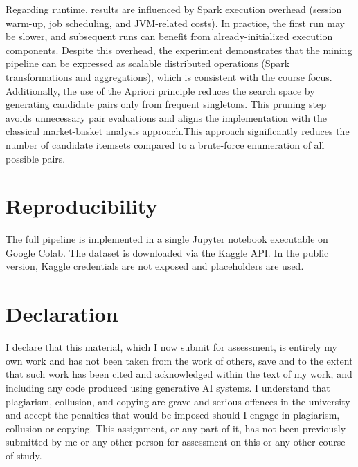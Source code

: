 \documentclass[11pt,a4paper]{article}
\begin{document}
Regarding runtime, results are influenced by Spark execution overhead (session warm-up, job scheduling, and JVM-related costs). In practice, the first run may be slower, and subsequent runs can benefit from already-initialized execution components. Despite this overhead, the experiment demonstrates that the mining pipeline can be expressed as scalable distributed operations (Spark transformations and aggregations), which is consistent with the course focus. 
Additionally, the use of the Apriori principle reduces the search space by generating candidate pairs only from frequent singletons. This pruning step avoids unnecessary pair evaluations and aligns the implementation with the classical market-basket analysis approach.This approach significantly reduces the number of candidate itemsets compared to a brute-force enumeration of all possible pairs.


\section{Reproducibility}
The full pipeline is implemented in a single Jupyter notebook executable on Google Colab. The dataset is downloaded via the Kaggle API. In the public version, Kaggle credentials are not exposed and placeholders are used.

\section*{Declaration}
I declare that this material, which I now submit for assessment, is entirely my own work and has not been taken from the work of others, save and to the extent that such work has been cited and acknowledged within the text of my work, and including any code produced using generative AI systems. I understand that plagiarism, collusion, and copying are grave and serious offences in the university and accept the penalties that would be imposed should I engage in plagiarism, collusion or copying. This assignment, or any part of it, has not been previously submitted by me or any other person for assessment on this or any other course of study.
\end{document}
